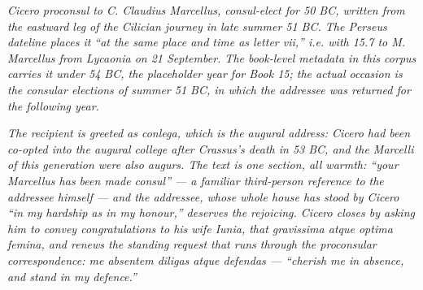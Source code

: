 
\textit{Cicero proconsul to C. Claudius Marcellus, consul-elect
for 50 BC, written from the eastward leg of the Cilician
journey in late summer 51 BC. The Perseus dateline places it
``at the same place and time as letter vii,'' i.e. with 15.7
to M. Marcellus from Lycaonia on 21 September. The book-level
metadata in this corpus carries it under 54 BC, the placeholder
year for Book 15; the actual occasion is the consular elections
of summer 51 BC, in which the addressee was returned for the
following year.}

\textit{The recipient is greeted as \textit{conlega}, which is
the augural address: Cicero had been co-opted into the augural
college after Crassus's death in 53 BC, and the Marcelli of
this generation were also augurs. The text is one section, all
warmth: ``your Marcellus has been made consul'' --- a familiar
third-person reference to the addressee himself --- and the
addressee, whose whole house has stood by Cicero ``in my
hardship as in my honour,'' deserves the rejoicing. Cicero
closes by asking him to convey congratulations to his wife
Iunia, that \textit{gravissima atque optima femina}, and
renews the standing request that runs through the proconsular
correspondence: \textit{me absentem diligas atque defendas} ---
``cherish me in absence, and stand in my defence.''}
